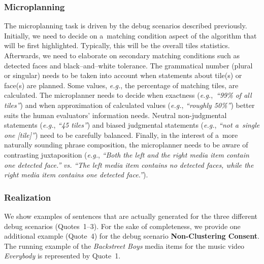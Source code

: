 \documentclass{article}
\begin{document}
\subsubsection{Microplanning}
The microplanning task is driven by the debug scenarios described previously. Initially, we need to decide on a~matching condition aspect of the algorithm that will be first highlighted. Typically, this will be the overall tiles statistics. Afterwards, we need to elaborate on secondary matching conditions such as detected faces and black--and--white tolerance. The grammatical number (plural or singular) needs to be taken into account when statements about tile(s) or face(s) are planned. Some values, \emph{e.g.}, the percentage of matching tiles, are calculated. The microplanner needs to decide when exactness (\emph{e.g.},~\textit{``99\% of all tiles''}) and when approximation of calculated values (\emph{e.g.}, \textit{``roughly 50\%''}) better suits the human evaluators' information needs. Neutral non-judgmental statements (\emph{e.g.}, \textit{``45 tiles''}) and biased judgmental statements (\emph{e.g.}, \textit{``not a~single one [tile]''}) need to be carefully balanced. Finally, in the interest of a~more naturally sounding phrase composition, the microplanner needs to be aware of contrasting juxtaposition (\emph{e.g.}, \textit{``Both the left and the right media item contain one detected face.''} \emph{vs.} \textit{``The left media item contains no detected faces, while the right media item contains one detected face.''}).

\subsubsection{Realization}
We show examples of sentences that are actually generated for the three different debug scenarios (Quotes~1--3). For the sake of completeness, we provide one additional example (Quote~4) for the debug scenario \textbf{Non-Clustering Consent}. The running example of the \emph{Backstreet Boys} media items for the music video \emph{Everybody} is represented by Quote~1.
\end{document}
